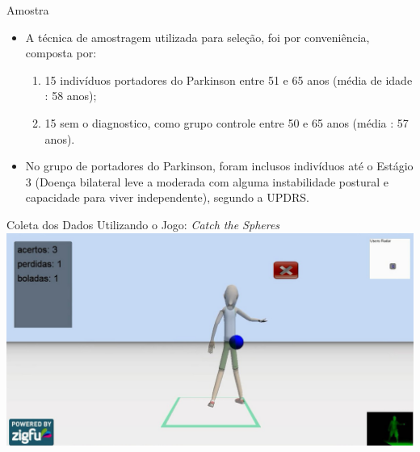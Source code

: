 \documentclass{beamer}
\begin{document}
\begin{frame}{Amostra} 
    \begin{block}{}
			\begin{itemize}[<+->]
				\item A técnica de amostragem utilizada para seleção, foi por conveniência, composta por:
				\begin{enumerate}
					\item 15 indivíduos portadores do Parkinson entre 51 e 65 anos (média de idade : 58 anos);
					\item 15 sem o diagnostico, como grupo controle entre 50 e 65 anos (média : 57 anos).
				\end{enumerate}
					\item No grupo de portadores do Parkinson, foram inclusos indivíduos até o Estágio 3 (Doença bilateral leve a moderada com alguma instabilidade postural e capacidade para viver independente), segundo a UPDRS.
				\end{itemize}
    \end{block}
\end{frame}
 
\begin{frame}{Coleta dos Dados Utilizando o Jogo: \textit{Catch the Spheres}}
      \center \includegraphics[height=2.2 in]{img/catch-the-spheres.png}
\end{frame}
\end{document}
